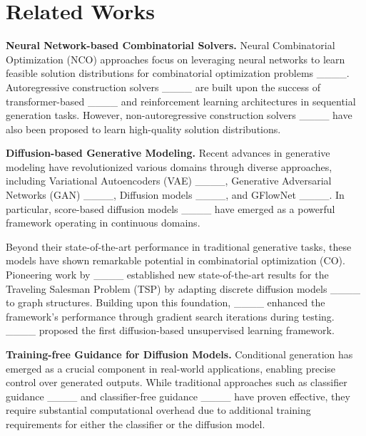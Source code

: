 \section{Related Works}
\noindent\textbf{Neural Network-based Combinatorial Solvers.} Neural Combinatorial Optimization (NCO) approaches focus on leveraging neural networks to learn feasible solution distributions for combinatorial optimization problems ____. Autoregressive construction solvers ____ are built upon the success of transformer-based ____ and reinforcement learning architectures in sequential generation tasks. However, non-autoregressive construction solvers ____ have also been proposed to learn high-quality solution distributions.

\noindent\textbf{Diffusion-based Generative Modeling.} Recent advances in generative modeling have revolutionized various domains through diverse approaches, including Variational Autoencoders (VAE) ____, Generative Adversarial Networks (GAN) ____, Diffusion models ____, and GFlowNet ____. In particular, score-based diffusion models ____ have emerged as a powerful framework operating in continuous domains.

Beyond their state-of-the-art performance in traditional generative tasks, these models have shown remarkable potential in combinatorial optimization (CO). Pioneering work by ____ established new state-of-the-art results for the Traveling Salesman Problem (TSP) by adapting discrete diffusion models ____ to graph structures. Building upon this foundation, ____ enhanced the framework's performance through gradient search iterations during testing. ____ proposed the first diffusion-based unsupervised learning framework.

\noindent\textbf{Training-free Guidance for Diffusion Models.} Conditional generation has emerged as a crucial component in real-world applications, enabling precise control over generated outputs. While traditional approaches such as classifier guidance ____ and classifier-free guidance ____ have proven effective, they require substantial computational overhead due to additional training requirements for either the classifier or the diffusion model.

